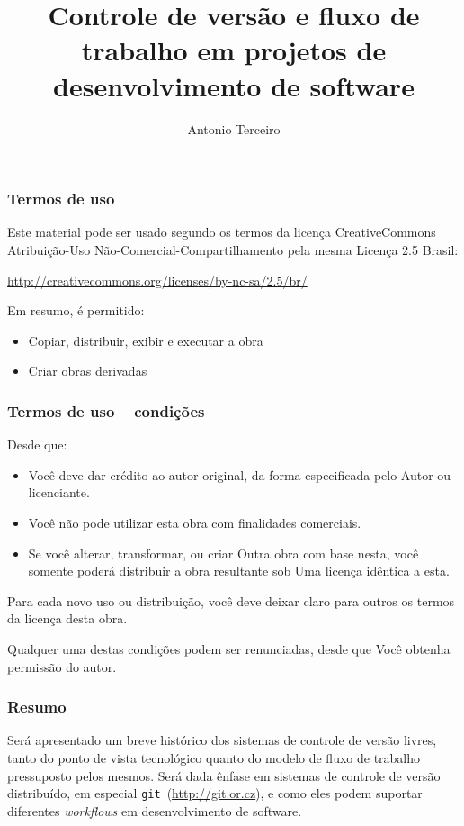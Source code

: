 \documentclass{beamer}
\title[CV e fluxo de trabalho em projetos de software]{Controle de versão e fluxo de trabalho em projetos de
desenvolvimento de software}
\author{Antonio Terceiro}
\institute{
  Doutorado Multi-Institucional em Ciência da Computação\\
  UFBA -- UNIFACS -- UEFS\\
  terceiro@dcc.ufba.br
}
\newcommand{\git}{\texttt{git}}
\begin{document}
\begin{frame}[plain]
  \titlepage
\end{frame}

\begin{frame}
  \frametitle{Termos de uso}
  Este material pode ser usado segundo os termos da licença CreativeCommons
  Atribuição-Uso Não-Comercial-Compartilhamento pela mesma Licença 2.5 Brasil:

  \url{http://creativecommons.org/licenses/by-nc-sa/2.5/br/}

  Em resumo, é permitido:
  \begin{itemize}
    \item Copiar, distribuir, exibir e executar a obra
    \item Criar obras derivadas
  \end{itemize}
\end{frame}
\begin{frame}
  \frametitle{Termos de uso -- condições}
  Desde que:
  \begin{itemize}
    \item {} Você deve dar crédito ao autor
      original, da forma especificada pelo Autor ou licenciante.
    \item {} Você não pode utilizar esta
      obra com finalidades comerciais.
    \item {} Se você
      alterar, transformar, ou criar Outra obra com base nesta, você
      somente poderá distribuir a obra resultante sob Uma licença
      idêntica a esta.
  \end{itemize}

  Para cada novo uso ou distribuição, você deve deixar claro para outros os
  termos da licença desta obra.

  Qualquer uma destas condições podem ser renunciadas, desde que Você obtenha
  permissão do autor.
\end{frame}

\begin{frame}
  \frametitle{Resumo}

  Será apresentado um breve histórico dos sistemas de controle de
  versão livres, tanto do ponto de vista tecnológico quanto do modelo
  de fluxo de trabalho pressuposto pelos mesmos. Será dada ênfase em
  sistemas de controle de versão distribuído, em especial \git\
  (\url{http://git.or.cz}), e como eles podem suportar diferentes
  \emph{workflows} em desenvolvimento de software.
\end{frame}
\end{document}
